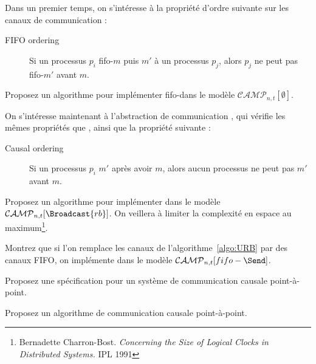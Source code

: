 
\begingroup

\begin{exercice}
  Dans un premier temps, on s'intéresse à la propriété d'ordre suivante sur les canaux de communication : 
  \begin{description}
  \item[FIFO ordering] Si un processus $p_i$ fifo-\Send $m$ puis $m'$ à un processus $p_j$, alors $p_j$ ne peut pas fifo-\Receive $m'$ avant $m$. 
  \end{description}
  \begin{questions}
  \item Proposez un algorithme pour implémenter fifo-\Send dans le modèle $\mathcal{CAMP}_{n, t}[\emptyset]$. 
  \end{questions}

  On s'intéresse maintenant à l'abstraction de communication ,
  qui vérifie les mêmes propriétés que , ainsi que la propriété suivante :
  \begin{description}
  \item[Causal ordering] Si un processus $p_i$  $m'$ après avoir  $m$,
    alors aucun processus ne peut pas  $m'$ avant $m$.
  \end{description}
  \begin{questions}
  \item Proposez un algorithme pour implémenter  dans le modèle \linebreak $\mathcal{CAMP}_{n, t}[\Broadcast{rb}]$.
    On veillera à limiter la complexité en espace au maximum\footnote{Bernadette Charron-Bost. \emph{Concerning the Size of Logical Clocks in Distributed Systems.} IPL 1991}. 
  \item Montrez que si l'on remplace les canaux de l'algorithme~\ref{algo:URB} par des canaux FIFO,
    on implémente \linebreak {} dans le modèle $\mathcal{CAMP}_{n, t}[fifo-\Send]$.
  \item Proposez une spécification pour un système de communication causale point-à-point.
  \item Proposez un algorithme de communication causale point-à-point.
  \end{questions}
\end{exercice}

\endgroup
\endinput
